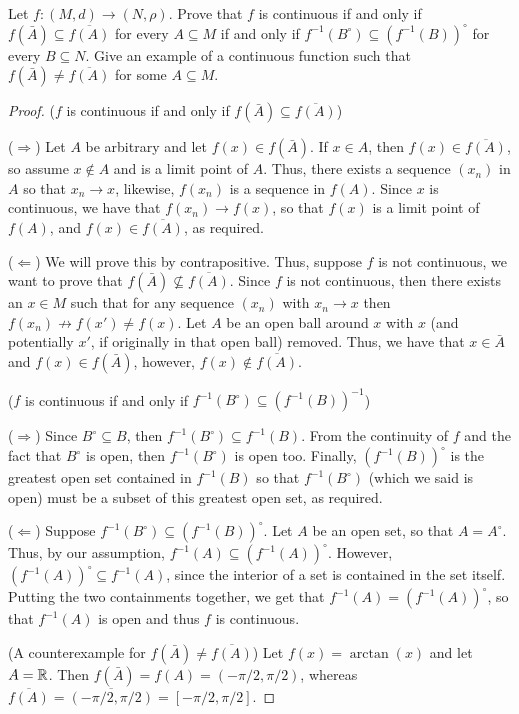 \begin{exercise}{30}
Let $f: (M,d) \to (N,\rho)$.
Prove that $f$ is continuous if and only if $f(\bar{A})\subseteq \overline{f(A)}$ for every $A \subseteq M$ if and only if $f^{-1}(B^\circ) \subseteq (f^{-1}(B))^\circ$ for every $B \subseteq N$.
Give an example of a continuous function such that $f(\bar{A}) \neq \overline{f(A)}$ for some $A \subseteq M$.
\end{exercise}
\begin{proof}
($f$ is continuous if and only if $f(\bar{A})\subseteq \overline{f(A)}$)

($\Rightarrow$)
Let $A$ be arbitrary and let $f(x)\in f(\bar{A})$.
If $x\in A$, then $f(x)\in\overline{f(A)}$, so assume $x\notin A$ and is a limit point of $A$.
Thus, there exists a sequence $(x_n)$ in $A$ so that $x_n\to x$, likewise, $f(x_n)$ is a sequence in $f(A)$.
Since $x$ is continuous, we have that $f(x_n)\to f(x)$, so that $f(x)$ is a limit point of $f(A)$, and $f(x)\in\overline{f(A)}$, as required.

($\Leftarrow$)
We will prove this by contrapositive.
Thus, suppose $f$ is not continuous, we want to prove that $f(\bar{A}) \not\subseteq \overline{f(A)}$.
Since $f$ is not continuous, then there exists an $x\in M$ such that for any sequence $(x_n)$ with $x_n\to x$ then $f(x_n)\not\to f(x') \neq f(x)$.
Let $A$ be an open ball around $x$ with $x$ (and potentially $x'$, if originally in that open ball) removed.
Thus, we have that $x\in\bar{A}$ and $f(x) \in f(\bar{A})$, however, $f(x)\notin \overline{f(A)}$.

($f$ is continuous if and only if $f^{-1}(B^\circ)\subseteq (f^{-1}(B))^{-1}$)

($\Rightarrow$)
Since $B^\circ\subseteq B$, then $f^{-1}(B^\circ) \subseteq f^{-1}(B)$.
From the continuity of $f$ and the fact that $B^\circ$ is open, then $f^{-1}(B^\circ)$ is open too.
Finally, $(f^{-1}(B))^\circ$ is the greatest open set contained in $f^{-1}(B)$ so that $f^{-1}(B^\circ)$ (which we said is open) must be a subset of this greatest open set, as required.

($\Leftarrow$)
Suppose $f^{-1}(B^\circ)\subseteq (f^{-1}(B))^\circ$.
Let $A$ be an open set, so that $A=A^\circ$.
Thus, by our assumption, $f^{-1}(A)\subseteq (f^{-1}(A))^\circ$.
However, $(f^{-1}(A))^\circ\subseteq f^{-1}(A)$, since the interior of a set is contained in the set itself. 
Putting the two containments together, we get that $f^{-1}(A) = (f^{-1}(A))^\circ$, so that $f^{-1}(A)$ is open and thus $f$ is continuous.

(A counterexample for $f(\bar{A}) \neq \overline{f(A)}$)
Let $f(x)=\arctan(x)$ and let $A=\mathbb{R}$.
Then $f(\bar{A})=f(A)=(-\pi/2,\pi/2)$, whereas $\overline{f(A)}=\overline{(-\pi/2,\pi/2)}=[-\pi/2,\pi/2]$.
\end{proof} 

